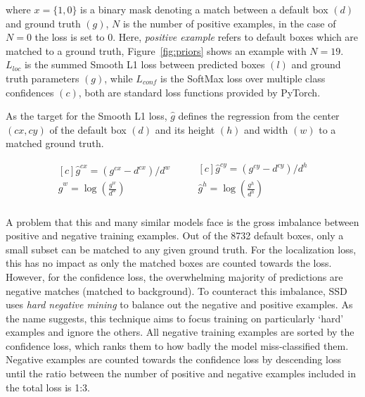 where \( x=\{1,0\} \) is a binary mask denoting a match between a default box \((d)\) and ground truth \((g)\), \( N \) is the number of positive examples, in the case of \(N=0\) the loss is set to 0.
Here, \textit{positive example} refers to default boxes which are matched to a ground truth, Figure~\ref{fig:priors} shows an example with \(N=19\).
\( L_{loc} \) is the summed Smooth L1 loss between predicted boxes \((l)\) and ground truth parameters \((g)\), while \( L_{conf} \) is the SoftMax loss over multiple class confidences \((c)\), both are standard loss functions provided by PyTorch.

As the target for the Smooth L1 loss, \(\hat{g}\) defines the regression from the center \((cx,cy)\) of the default box \((d)\) and its height \((h)\) and width \((w)\) to a matched ground truth.

\begin{equation*}
  \begin{aligned}[c]
\hat{g}^{cx}=(g^{cx}-d^{cx})/d^{w}\\
\hat{g}^{w}=\log\left(\frac{g^{w}}{d^{w}}\right)\\
  \end{aligned}
  \qquad
  \begin{aligned}[c]
    \hat{g}^{cy}=(g^{cy}-d^{cy})/d^{h}\\
    \hat{g}^{h}=\log\left(\frac{g^{h}}{d^{h}}\right)\\
  \end{aligned}
  \end{equation*}

A problem that this and many similar models face is the gross imbalance between positive and negative training examples.
Out of the 8732 default boxes, only a small subset can be matched to any given ground truth.
For the localization loss, this has no impact as only the matched boxes are counted towards the loss. However, for the confidence loss, the overwhelming majority of predictions are negative matches (matched to background).
To counteract this imbalance, SSD uses \textit{hard negative mining} to balance out the negative and positive examples.
As the name suggests, this technique aims to focus training on particularly `hard' examples and ignore the others.
All negative training examples are sorted by the confidence loss, which ranks them to how badly the model miss-classified them.
Negative examples are counted towards the confidence loss by descending loss until the ratio between the number of positive and negative examples included in the total loss is 1:3.

